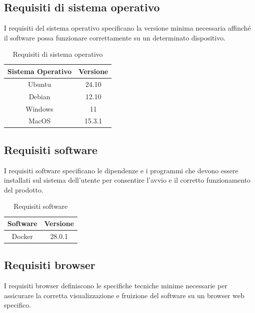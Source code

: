 \documentclass[10pt]{article}
\begin{document}
\begin{justify}
\subsection{Requisiti di sistema operativo}
I requisiti del sistema operativo specificano la versione minima necessaria affinché il software possa funzionare correttamente su un determinato dispositivo.

\begin{table}[H]
    \centering
    \begin{tabular}{|c|c|}
        \hline
        \rowcolor{gray!25}
        Sistema Operativo & Versione \\
        \hline
        Ubuntu & 24.10\\ 
        \hline
        Debian & 12.10\\
        \hline
        Windows & 11\\
        \hline
        MacOS & 15.3.1\\
        \hline
    \end{tabular}
    \caption{Requisiti di sistema operativo}
    \label{tab:requisiti_sistema}
\end{table}

\subsection{Requisiti software}
I requisiti software specificano le dipendenze e i programmi che devono essere installati sul sistema dell’utente per consentire l’avvio e il corretto funzionamento del prodotto.

\begin{table}[H]
    \centering
    \begin{tabular}{|c|c|}
        \hline
        \rowcolor{gray!25}
        Software & Versione \\
        \hline
        Docker & 28.0.1\\
        \hline
    \end{tabular}
    \caption{Requisiti software}
    \label{tab:requisiti_software}
\end{table}

\subsection{Requisiti browser}
I requisiti browser definiscono le specifiche tecniche minime necessarie per assicurare la corretta visualizzazione e fruizione del software su un browser web specifico.


\end{justify}
\end{document}
